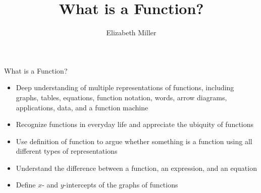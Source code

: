 \documentclass{ximera}
\author{Elizabeth Miller}
\title{What is a Function?}
\begin{document}
\begin{abstract}
\end{abstract}
\maketitle


\begin{objectives}

\item What is a Function?
\begin{itemize}
	\item Deep understanding of multiple representations of functions, including graphs, tables, equations, function notation, words, arrow diagrams, applications, data, and a function machine 
	\item Recognize functions in everyday life and appreciate the ubiquity of functions 
	\item Use definition of function to argue whether something is a function using all different types of representations
	\item Understand the difference between a function, an expression, and an equation
	\item Define $x$- and $y$-intercepts of the graphs of functions
\end{itemize}




\end{objectives}
\end{document}
